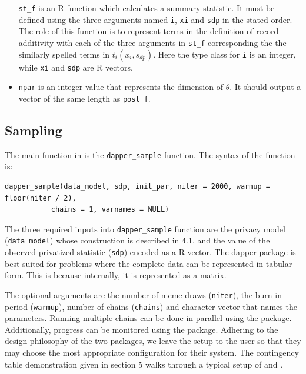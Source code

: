 \begin{itemize}
  \texttt{st\_f} is an R function which calculates a summary statistic. It
  must be defined using the three arguments named \texttt{i}, \texttt{xi} and \texttt{sdp}
  in the stated order. The role of this function is to represent terms in the definition of record additivity
  with each of the three arguments in \texttt{st\_f} corresponding the the similarly spelled
  terms in \(t_i(x_i, s_{dp})\). Here the type class for \texttt{i} is an integer,
  while \texttt{xi} and \texttt{sdp} are R vectors.
\item
  \texttt{npar} is an integer value that represents the dimension of \(\theta\). It
  should output a vector of the same length as \texttt{post\_f}.
\end{itemize}

\hypertarget{sampling}{%
\subsection{Sampling}\label{sampling}}

The main function in  is the \texttt{dapper\_sample} function. The syntax of the function is:

\begin{verbatim}
dapper_sample(data_model, sdp, init_par, niter = 2000, warmup = floor(niter / 2),
           chains = 1, varnames = NULL)
\end{verbatim}

The three required inputs into \texttt{dapper\_sample} function are the privacy model (\texttt{data\_model})
whose construction is described in 4.1, and the value
of the observed privatized statistic (\texttt{sdp}) encoded as a R vector. The dapper
package is best suited for problems where the complete data can be represented in
tabular form. This is because internally, it is represented as a matrix.

The optional arguments are the number of mcmc draws (\texttt{niter}), the
burn in period (\texttt{warmup}), number of chains (\texttt{chains}) and character
vector that names the parameters. Running multiple chains can be done in parallel
using the  package. Additionally, progress can be monitored
using the  package. Adhering to the design philosophy
of the two packages, we leave the setup to the user so that they may
choose the most appropriate configuration for their system. The
contingency table demonstration given in section 5 walks
through a typical setup of  and .

